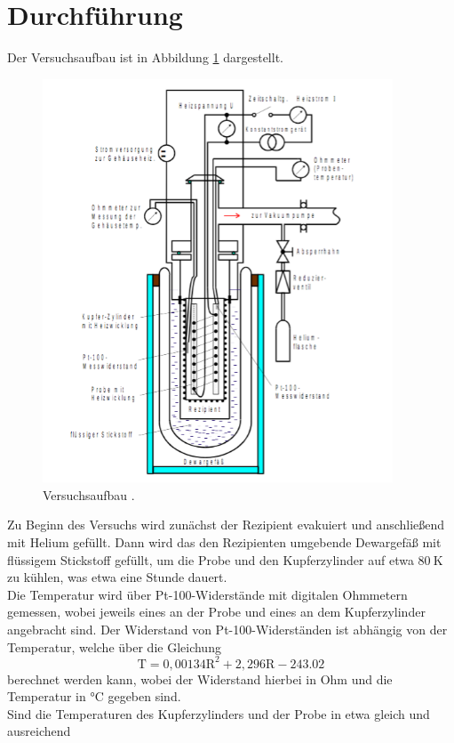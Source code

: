 \section{Durchführung}

Der Versuchsaufbau ist in Abbildung \ref{fig:aufbau} dargestellt.
\begin{figure}[H]
  \centering
  \includegraphics[height=12cm]{Aufbau.png}
  \caption{Versuchsaufbau \cite{skript}.}
  \label{fig:aufbau}
\end{figure}
Zu Beginn des Versuchs wird zunächst der Rezipient evakuiert und anschließend mit Helium
gefüllt. Dann wird das den Rezipienten umgebende Dewargefäß mit flüssigem
Stickstoff gefüllt, um die Probe und den Kupferzylinder auf etwa $\SI{80}{\kelvin}$
zu kühlen, was etwa eine Stunde dauert. \\
Die Temperatur wird über Pt-100-Widerstände mit
digitalen Ohmmetern gemessen, wobei jeweils eines an der
Probe und eines an dem Kupferzylinder angebracht sind.
Der Widerstand von Pt-100-Widerständen ist abhängig von der Temperatur, welche über
die Gleichung
\begin{equation}
   \text{T}= 0,00134\text{R}^2 + 2,296\text{R}-243.02
   \label{eqn:Widerstand}
\end{equation}
berechnet werden kann, wobei der Widerstand hierbei in Ohm und die Temperatur in °C
gegeben sind. \\
Sind die Temperaturen des Kupferzylinders und der Probe in etwa gleich und ausreichend
